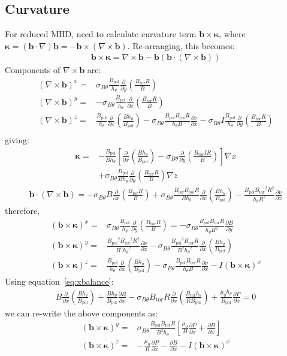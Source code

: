 \documentclass[12pt]{article}
\def\L{\left}
\def\R{\right}
\newcommand{\sbt}{\ensuremath{\sigma_{B\theta}}}
\newcommand{\deriv}[2]{\ensuremath{\frac{\partial #1}{\partial #2}}}
\newcommand{\hthe}{\ensuremath{h_\theta}}
\newcommand{\Bp}{\ensuremath{B_{\text{pol}}}}
\newcommand{\Bt}{\ensuremath{B_{\text{tor}}}}
\newcommand{\ve}[1]{\ensuremath{\boldsymbol{#1}}}
\newcommand{\bvec}{\ve{b}}
\begin{document}
\subsection{Curvature}
%
For reduced MHD, need to calculate curvature term $\bvec\times\ve{\kappa}$,
where $\ve{\kappa} = \L(\bvec\cdot\nabla\R)\bvec =
-\bvec\times\L(\nabla\times\bvec\R)$. Re-arranging, this becomes:
%
\begin{align*}
\bvec\times\ve{\kappa} = \nabla\times\bvec -
\bvec\L(\bvec\cdot\L(\nabla\times\bvec\R)\R)
\end{align*}
%
Components of $\nabla\times\bvec$ are:
%
\begin{align*}
\L(\nabla\times\bvec\R)^x =& \sbt\frac{\Bp}{\hthe}\deriv{}{y}\L(\frac{\Bt
R}{B}\R) \\ \L(\nabla\times\bvec\R)^y =&
    -\sbt\frac{\Bp}{\hthe}\deriv{}{x}\L(\frac{\Bt R}{B}\R) \\
    \L(\nabla\times\bvec\R)^z =&
    \frac{\Bp}{\hthe}\deriv{}{x}\L(\frac{B\hthe}{\Bp}\R) - \sbt\frac{\Bp\Bt
    R}{\hthe B}\deriv{\nu}{x} - \sbt I\frac{\Bp}{\hthe}\deriv{}{y}\L(\frac{\Bt
    R}{B}\R) \\
\end{align*}
%
giving:
%
\begin{align}
\ve{\kappa} =& -\frac{\Bp}{B h_\theta}\L[\deriv{}{x}\L(\frac{B
h_\theta}{\Bp}\R) - \sbt\deriv{}{y}\L(\frac{\Bt I R}{B}\R)\R]\nabla x \nonumber
\\ &+ \sbt\frac{\Bp}{B h_\theta}\deriv{}{y}\L(\frac{\Bt R}{B}\R)\nabla z
\label{eq:curvature}
\end{align}
%
\begin{align*}
\bvec\cdot\L(\nabla\times\bvec\R) = -\sbt B\deriv{}{x}\L(\frac{\Bt R}{B}\R) +
\sbt \frac{\Bt\Bp R}{B\hthe}\deriv{}{x}\L(\frac{B\hthe}{\Bp}\R) -
\frac{\Bp\Bt^2R^2}{\hthe B^2}\deriv{\nu}{x}
\end{align*}
%
therefore,
%
\begin{align*}
\L(\bvec\times\ve{\kappa}\R)^x =& \sbt\frac{\Bp}{\hthe}\deriv{}{y}\L(\frac{\Bt
R}{B}\R) = -\sbt\frac{\Bp\Bt R}{\hthe B^2}\deriv{B}{y} \\
\L(\bvec\times\ve{\kappa}\R)^y =& \frac{\Bp^2\Bt^2
R^2}{B^3\hthe^2}\deriv{\nu}{x} - \sbt\frac{\Bp^2\Bt
R}{B^2\hthe^2}\deriv{}{x}\L(\frac{B\hthe}{\Bp}\R) \\
\L(\bvec\times\ve{\kappa}\R)^z =&
\frac{\Bp}{\hthe}\deriv{}{x}\L(\frac{B\hthe}{\Bp}\R) - \sbt\frac{\Bp\Bt
R}{\hthe B}\deriv{\nu}{x} - I\L(\bvec\times\ve{\kappa}\R)^x
\end{align*}
%
Using equation~\ref{eq:xbalance}:
%
\begin{align*}
B\deriv{}{x}\L(\frac{B\hthe}{\Bp}\R) + \frac{B\hthe}{\Bp}\deriv{B}{x} - \sbt\Bt
R\deriv{}{x}\L(\frac{\Bt\hthe}{R\Bp}\R) + \frac{\mu_0\hthe}{\Bp}\deriv{P}{x} =
0
\end{align*}
%
we can re-write the above components as:
%
\begin{align*}
\L(\bvec\times\ve{\kappa}\R)^y =& \sbt\frac{\Bp\Bt
R}{B^2\hthe}\L[\frac{\mu_0}{B}\deriv{P}{x} + \deriv{B}{x}\R] \\
\L(\bvec\times\ve{\kappa}\R)^z =& -\frac{\mu_0}{B}\deriv{P}{x} - \deriv{B}{x} -
I\L(\bvec\times\ve{\kappa}\R)^x
\end{align*}
%
\end{document}
